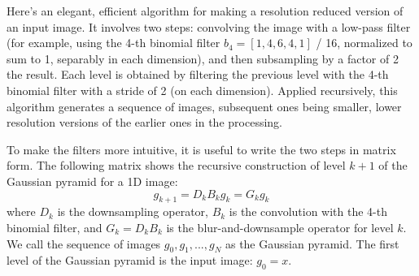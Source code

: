 Here's an elegant, efficient algorithm for making a resolution reduced version of an input image.  It involves two steps:  convolving the
image with a low-pass filter (for example, using the 4-th binomial filter $b_4 = [1, 4, 6, 4, 1]$ / 16, normalized to sum to 1, separably in each dimension), and then subsampling by a factor of 2 the result. Each level is obtained by filtering the previous level with the 4-th binomial filter with a stride of 2 (on each dimension). Applied recursively, this algorithm generates a sequence of images,  subsequent ones being smaller, lower resolution versions of the earlier ones in the processing.

To make the filters more intuitive, it is useful to write the two steps in matrix form. The following matrix shows the recursive construction of  level $k+1$ of the Gaussian pyramid for a 1D image:
\begin{equation}
g_{k+1} = D_k B_k g_k = G_k g_k
\end{equation}
where $D_k$ is the downsampling operator, $B_k$ is the convolution with the 4-th binomial filter, and $G_k = D_kB_k$ is the blur-and-downsample operator for level $k$. We call the  sequence of images  $g_0,  g_1, . . ., g_N$  as the Gaussian pyramid.  The first level of the Gaussian pyramid is the input image: $g_0=x$.


